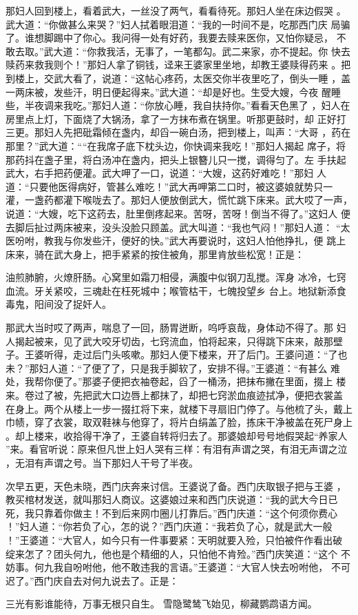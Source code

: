 那妇人回到楼上，看着武大，一丝没了两气，看看待死。那妇人坐在床边假哭
。武大道：“你做甚么来哭？”妇人拭着眼泪道：“我的一时间不是，吃那西门庆
局骗了。谁想脚踢中了你心。我问得一处有好药，我要去赎来医你，又怕你疑忌，
不敢去取。”武大道：“你救我活，无事了，一笔都勾。武二来家，亦不提起。你
快去赎药来救我则个！”那妇人拿了铜钱，迳来王婆家里坐地，却教王婆赎得药来
。把到楼上，交武大看了，说道：“这帖心疼药，太医交你半夜里吃了，倒头一睡
，盖一两床被，发些汗，明日便起得来。”武大道：“却是好也。生受大嫂，今夜
醒睡些，半夜调来我吃。”那妇人道：“你放心睡，我自扶持你。”看看天色黑了
，妇人在房里点上灯，下面烧了大锅汤，拿了一方抹布煮在锅里。听那更鼓时，却
正好打三更。那妇人先把砒霜倾在盏内，却舀一碗白汤，把到楼上，叫声：“大哥
，药在那里？”武大道：““在我席子底下枕头边，你快调来我吃！”那妇人揭起
席子，将那药抖在盏子里，将白汤冲在盏内，把头上银簪儿只一搅，调得匀了。左
手扶起武大，右手把药便灌。武大呷了一口，说道：“大嫂，这药好难吃！”那妇
人道：“只要他医得病好，管甚么难吃！”武大再呷第二口时，被这婆娘就势只一
灌，一盏药都灌下喉咙去了。那妇人便放倒武大，慌忙跳下床来。武大哎了一声，
说道：“大嫂，吃下这药去，肚里倒疼起来。苦呀，苦呀！倒当不得了。”这妇人
便去脚后扯过两床被来，没头没脸只顾盖。武大叫道：“我也气闷！”那妇人道：
“太医吩咐，教我与你发些汗，便好的快。”武大再要说时，这妇人怕他挣扎，便
跳上床来，骑在武大身上，把手紧紧的按住被角，那里肯放些松宽！正是：

油煎肺腑，火燎肝肠。心窝里如霜刀相侵，满腹中似钢刀乱搅。浑身
冰冷，七窍血流。牙关紧咬，三魂赴在枉死城中；喉管枯干，七魄投望乡
台上。地狱新添食毒鬼，阳间没了捉奸人。

那武大当时哎了两声，喘息了一回，肠胃迸断，呜呼哀哉，身体动不得了。那
妇人揭起被来，见了武大咬牙切齿，七窍流血，怕将起来，只得跳下床来，敲那壁
子。王婆听得，走过后门头咳嗽。那妇人便下楼来，开了后门。王婆问道：“了也
未？”那妇人道：“了便了了，只是我手脚软了，安排不得。”王婆道：“有甚么
难处，我帮你便了。”那婆子便把衣袖卷起，舀了一桶汤，把抹布撇在里面，掇上
楼来。卷过了被，先把武大口边唇上都抹了，却把七窍淤血痕迹拭净，便把衣裳盖
在身上。两个从楼上一步一掇扛将下来，就楼下寻扇旧门停了。与他梳了头，戴上
巾帻，穿了衣裳，取双鞋袜与他穿了，将片白绢盖了脸，拣床干净被盖在死尸身上
。却上楼来，收拾得干净了，王婆自转将归去了。那婆娘却号号地假哭起“养家人
”来。看官听说：原来但凡世上妇人哭有三样：有泪有声谓之哭，有泪无声谓之泣
，无泪有声谓之号。当下那妇人干号了半夜。

次早五更，天色未晓，西门庆奔来讨信。王婆说了备。西门庆取银子把与王婆
，教买棺材发送，就叫那妇人商议。这婆娘过来和西门庆说道：“我的武大今日已
死，我只靠着你做主！不到后来网巾圈儿打靠后。”西门庆道：“这个何须你费心
！”妇人道：“你若负了心，怎的说？”西门庆道：“我若负了心，就是武大一般
！”王婆道：“大官人，如今只有一件事要紧：天明就要入殓，只怕被仵作看出破
绽来怎了？团头何九，他也是个精细的人，只怕他不肯殓。”西门庆笑道：“这个
不妨事。何九我自吩咐他，他不敢违我的言语。”王婆道：“大官人快去吩咐他，
不可迟了。”西门庆自去对何九说去了。正是：

三光有影谁能待，万事无根只自生。
雪隐鹭鸶飞始见，柳藏鹦鹉语方闻。